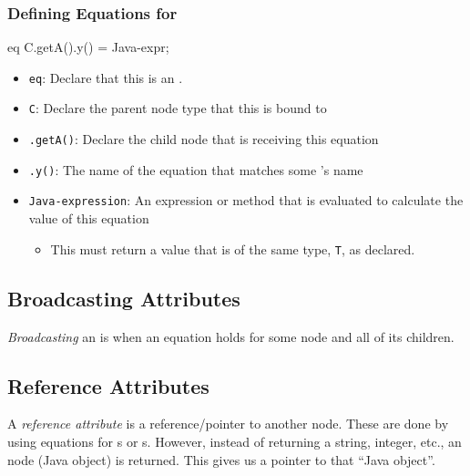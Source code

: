\subsubsection{Defining Equations for }\label{subsubsec:Define_Inherited_Equations}
\begin{javasource}
eq C.getA().y() = Java-expr;
\end{javasource}
  \begin{itemize}[noitemsep]
  \item \texttt{eq}: Declare that this  is an .
  \item \texttt{C}: Declare the parent  node type that this  is bound to
  \item \texttt{.getA()}: Declare the child  node that is receiving this equation
  \item \texttt{.y()}: The name of the equation that matches some 's name
  \item \texttt{Java-expression}: An expression or method that is evaluated to calculate the value of this equation
    \begin{itemize}[noitemsep]
    \item This must return a value that is of the same type, \texttt{T}, as declared.
    \end{itemize}
  \end{itemize}

\subsection{Broadcasting Attributes}\label{subsec:Broadcasting_Attributes}
\begin{definition}[Broadcasting]\label{def:Broadcasting}
  \emph{Broadcasting} an  is when an equation holds for some node and all of its children.
\end{definition}

\subsection{Reference Attributes}\label{subsec:Reference_Attributes}
\begin{definition}\label{def:Reference_Attribute}
  A \emph{reference attribute} is a reference/pointer to another  node.
  These are done by using equations for s or s.
  However, instead of returning a string, integer, etc., an  node (Java object) is returned.
  This gives us a pointer to that ``Java object''.
\end{definition}

